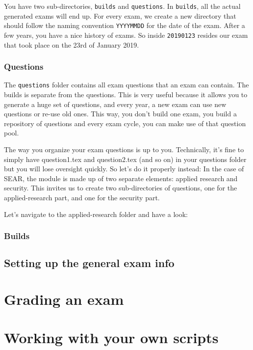 \documentclass{article}
\begin{document}
You have two sub-directories, \texttt{builds} and \texttt{questions}. In \texttt{builds}, all the actual generated exams will end up. For every exam, we create a new directory that should follow the naming convention \texttt{YYYYMMDD} for the date of the exam. After a few years, you have a nice history of exams. So inside \texttt{20190123} resides our exam that took place on the 23rd of January 2019.

\subsubsection{Questions}
The \texttt{questions} folder contains all exam questions that an exam can contain. The builds is separate from the questions. This is very useful because it allows you to generate a huge set of questions, and every year, a new exam can use new questions or re-use old ones. This way, you don't build one exam, you build a repository of questions and every exam cycle, you can make use of that question pool. 

The way you organize your exam questions is up to you. Technically, it's fine to simply have question1.tex and question2.tex (and so on) in your questions folder but you will lose oversight quickly. So let's do it properly instead: In the case of SEAR, the module is made up of two separate elements: applied research and security. This invites us to create two sub-directories of questions, one for the applied-research part, and one for the security part.

Let's navigate to the applied-research folder and have a look:
\subsubsection{Builds}
\subsection{Setting up the general exam info}
\section{\label{noobGrading}Grading an exam}
\section{Working with your own scripts}
\end{document}
